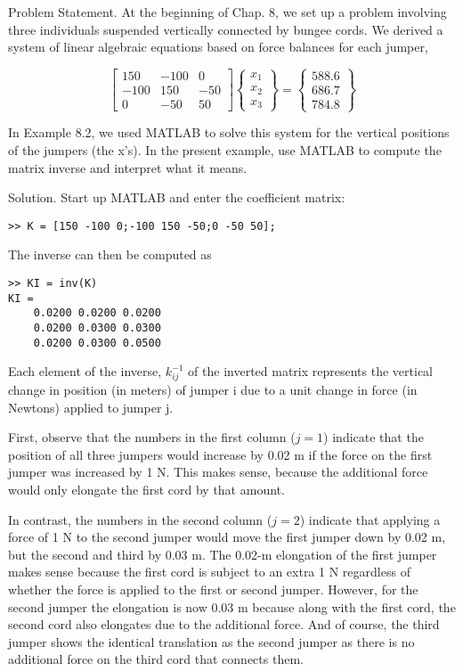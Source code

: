 \documentclass[../main.tex]{subfiles}
\begin{document}
Problem Statement. At the beginning of Chap. 8, we set up a problem involving three
individuals suspended vertically connected by bungee cords. We derived a system of linear
algebraic equations based on force balances for each jumper,

\begin{equation}
\begin{bmatrix}
150& -100& 0\\
-100& 150& -50\\
0& -50& 50
\end{bmatrix}
\begin{Bmatrix}
x_{1}\\ 
x_{2}\\ 
x_{3}
\end{Bmatrix}
=
\begin{Bmatrix}
588.6\\
686.7\\
784.8
\end{Bmatrix}
\end{equation}

In Example 8.2, we used MATLAB to solve this system for the vertical positions of the
jumpers (the x's). In the present example, use MATLAB to compute the matrix inverse and
interpret what it means.

Solution. Start up MATLAB and enter the coefficient matrix:
\begin{lstlisting}[numbers=none]
>> K = [150 -100 0;-100 150 -50;0 -50 50];
\end{lstlisting}
The inverse can then be computed as 
\begin{lstlisting}[numbers=none]
>> KI = inv(K)
KI =
	0.0200 0.0200 0.0200
	0.0200 0.0300 0.0300
	0.0200 0.0300 0.0500
\end{lstlisting}

Each element of the inverse, $k_{ij}^{-1}$ of the inverted matrix represents the vertical change in position (in meters) of jumper i due to a unit change in force (in Newtons) applied to jumper j. 

First, observe that the numbers in the first column ($j = 1$) indicate that the position of all three jumpers would increase by 0.02 m if the force on the first jumper was increased by 1 N. This makes sense, because the additional force would only elongate the first cord by that amount.

In contrast, the numbers in the second column ($j = 2$) indicate that applying a force
of 1 N to the second jumper would move the first jumper down by 0.02 m, but the second
and third by 0.03 m. The 0.02-m elongation of the first jumper makes sense because the
first cord is subject to an extra 1 N regardless of whether the force is applied to the first or second jumper. However, for the second jumper the elongation is now 0.03 m because along with the first cord, the second cord also elongates due to the additional force. And of course, the third jumper shows the identical translation as the second jumper as there is no additional force on the third cord that connects them.
\end{document}
